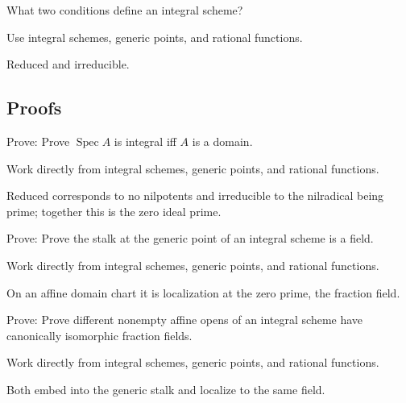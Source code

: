 \begin{exercise}\label{exr:vi27-expand-05}
What two conditions define an integral scheme?
\end{exercise}
\begin{hint}
Use integral schemes, generic points, and rational functions.
\end{hint}
\begin{solution}
Reduced and irreducible.
\end{solution}

\subsection*{Proofs}

\begin{exercise}\label{exr:vi27-expand-06}
Prove: Prove $\operatorname{Spec}A$ is integral iff $A$ is a domain.
\end{exercise}
\begin{hint}
Work directly from integral schemes, generic points, and rational functions.
\end{hint}
\begin{solution}
Reduced corresponds to no nilpotents and irreducible to the nilradical being prime; together this is the zero ideal prime.
\end{solution}

\begin{exercise}\label{exr:vi27-expand-07}
Prove: Prove the stalk at the generic point of an integral scheme is a field.
\end{exercise}
\begin{hint}
Work directly from integral schemes, generic points, and rational functions.
\end{hint}
\begin{solution}
On an affine domain chart it is localization at the zero prime, the fraction field.
\end{solution}

\begin{exercise}\label{exr:vi27-expand-08}
Prove: Prove different nonempty affine opens of an integral scheme have canonically isomorphic fraction fields.
\end{exercise}
\begin{hint}
Work directly from integral schemes, generic points, and rational functions.
\end{hint}
\begin{solution}
Both embed into the generic stalk and localize to the same field.
\end{solution}

